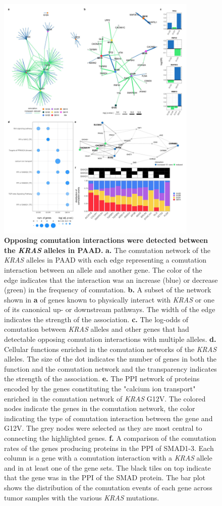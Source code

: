 \documentclass[english, 12pt, letterpaper]{article}
\newcommand{\KRAS}{\emph{KRAS}}
\begin{document}
\begin{figure}[p]
\centering
\includegraphics[height=120mm]{figures/SuppFigure_12.jpeg}
\caption{
    \textbf{Opposing comutation interactions were detected between the \KRAS{} alleles in PAAD.}
    \textbf{a.} The comutation network of the \KRAS{} alleles in PAAD with each edge representing a comutation interaction between an allele and another gene. The color of the edge indicates that the interaction was an increase (blue) or decrease (green) in the frequency of comutation.
    \textbf{b.} A subset of the network shown in \textbf{a} of genes known to physically interact with \KRAS{} or one of its canonical up- or downstream pathways. The width of the edge indicates the strength of the association.
    \textbf{c.} The log-odds of comutation between \KRAS{} alleles and other genes that had detectable opposing comutation interactions with multiple alleles.
    \textbf{d.} Cellular functions enriched in the comutation networks of the \KRAS{} alleles. The size of the dot indicates the number of genes in both the function and the comutation network and the transparency indicates the strength of the association.
    \textbf{e.} The PPI network of proteins encoded by the genes constituting the "calcium ion transport" enriched in the comutation network of \KRAS{} G12V. The colored nodes indicate the genes in the comutation network, the color indicating the type of comutation interaction between the gene and G12V. The grey nodes were selected as they are most central to connecting the highlighted genes.
    \textbf{f.} A comparison of the comutation rates of the genes producing proteins in the PPI of SMAD1-3. Each column is a gene with a comutation interaction with a \KRAS{} allele and in at least one of the gene sets. The black tiles on top indicate that the gene was in the PPI of the SMAD protein. The bar plot shows the distribution of the comutation events of each gene across tumor samples with the various \KRAS{} mutations.
}
\label{sfig:paad-comutation}
\end{figure}
\end{document}
